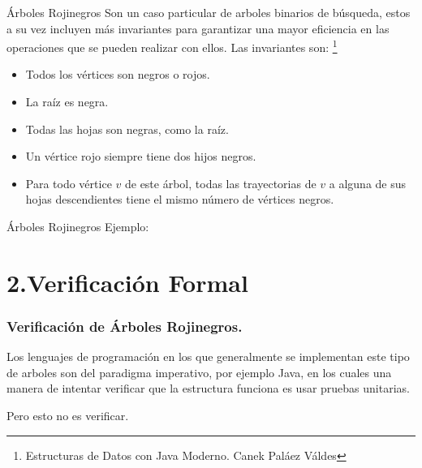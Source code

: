 \documentclass[xcolor=dvipsnames,table,handout]{beamer}
\begin{document}
\begin{frame}{Árboles Rojinegros}
Son un caso particular de arboles binarios de búsqueda, estos a su vez incluyen
más invariantes para garantizar una mayor eficiencia en las operaciones que se
pueden realizar con ellos. Las invariantes son:
\footnote[frame]{Estructuras de Datos con Java Moderno. Canek Paláez Váldes}
\begin{itemize}
    \item Todos los vértices son negros o rojos.
    \item La raíz es negra.
    \item Todas las hojas son negras, como la raíz.
    \item Un vértice rojo siempre tiene dos hijos negros.
    \item Para todo vértice $v$ de este árbol, todas las trayectorias de $v$ a
alguna de sus hojas descendientes tiene el mismo número de vértices negros.
\end{itemize}

\end{frame}

\begin{frame}{Árboles Rojinegros}
Ejemplo:

\centering
\end{frame}


\section{2.Verificación Formal}

\begin{frame}
  \frametitle{Verificación de Árboles Rojinegros.}

  Los lenguajes de programación en los que generalmente se implementan este tipo
de arboles son del paradigma imperativo, por ejemplo Java, en los cuales una
manera de
  intentar verificar que la estructura funciona es usar pruebas unitarias.

  \vspace*{10pt}
  \centering Pero esto no es verificar.

\end{frame}
\end{document}

